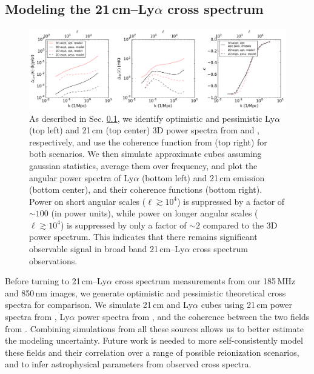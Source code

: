 \documentclass{emulateapj}
\begin{document}
\subsection{Modeling the 21\,cm--Ly$\alpha$ cross spectrum}
\label{sec:modelingthecrossspectrum}

\begin{figure}[h]
\centering
\includegraphics[width=7in]{images/spectra3D_to_2D.pdf}
\caption{As described in Sec. \ref{sec:modelingthecrossspectrum}, we identify optimistic and pessimistic Ly$\alpha$ (top left) and 21\,cm (top center) 3D power spectra from \citet{Gong2014} and \citet{PoberNextGen}, respectively, and use the coherence function from \citet{Heneka2016} (top right) for both scenarios. We then simulate approximate cubes assuming gaussian statistics, average them over frequency, and plot the angular power spectra of Ly$\alpha$ (bottom left) and 21\,cm emission (bottom center), and their coherence functions (bottom right). Power on short angular scales ($\ell\gtrsim10^4$) is suppressed by a factor of $\sim100$ (in power units), while power on longer angular scales ($\ell\gtrsim10^4$) is suppressed by only a factor of $\sim2$ compared to the 3D power spectrum. This indicates that there remains significant observable signal in broad band 21\,cm--Ly$\alpha$ cross spectrum observations. }
\label{fig:spectra3Dto2D}
\end{figure}

Before turning to 21\,cm--Ly$\alpha$ cross spectrum measurements from our 185\,MHz and 850\,nm images, we generate optimistic and pessimistic theoretical cross spectra for comparison. We simulate 21\,cm and Ly$\alpha$ cubes using 21\,cm power spectra from \citet{PoberNextGen}, Ly$\alpha$ power spectra from \citet{Gong2014}, and the coherence between the two fields from \citet{Heneka2016}. Combining simulations from all these sources allows us to better estimate the modeling uncertainty. Future work is needed to more self-consistently model these fields and their correlation over a range of possible reionization scenarios, and to infer astrophysical parameters from observed cross spectra.
\end{document}
